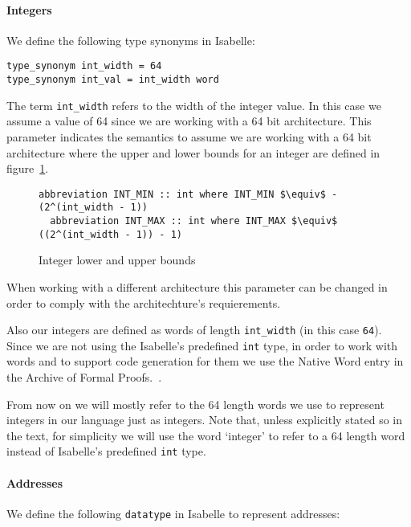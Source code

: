 \paragraph{Integers}

We define the following type synonyms in Isabelle:

\begin{lstlisting}[frame=single]
type_synonym int_width = 64
type_synonym int_val = int_width word
\end{lstlisting}


The term \verb|int_width| refers to the width of the integer value.
In this case we assume a value of 64 since we are working with a 64 bit architecture.
This parameter indicates the semantics to assume we are working with a 64 bit architecture where the upper and lower bounds for an integer are defined in figure~\ref{fig:int_bounds}.

\begin{figure}
  \begin{lstlisting}[frame=single, mathescape=true]
  abbreviation INT_MIN :: int where INT_MIN $\equiv$ - (2^(int_width - 1))
  abbreviation INT_MAX :: int where INT_MAX $\equiv$  ((2^(int_width - 1)) - 1)
  \end{lstlisting}

  \caption{Integer lower and upper bounds}
  \label{fig:int_bounds}
\end{figure}

When working with a different architecture this parameter can be changed in order to comply with the architechture's requierements.

Also our integers are defined as words of length \verb|int_width| (in this case \verb|64|).
Since we are not using the Isabelle's predefined \verb|int| type, in order to work with words and to support code generation for them we use the Native Word entry in the Archive of Formal Proofs.~\parencite{Native_Word-AFP}.

From now on we will mostly refer to the 64 length words we use to represent integers in our language just as integers.
Note that, unless explicitly stated so in the text, for simplicity we will use the word `integer' to refer to a 64 length word instead of Isabelle's predefined \verb|int| type.

\paragraph{Addresses}

We define the following \verb|datatype| in Isabelle to represent addresses:

